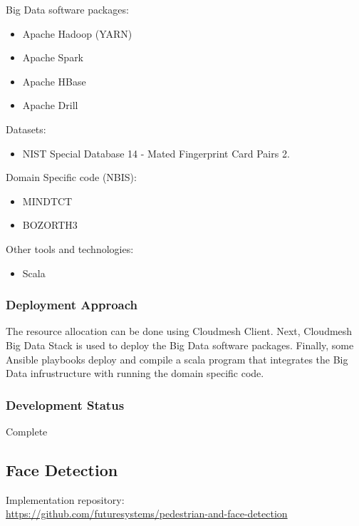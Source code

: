 \documentclass[9pt,twocolumn,twoside]{styles/osajnl}
\begin{document}
\begin{table}[htb]
Big Data software packages:

\begin{itemize}
\item Apache Hadoop (YARN)
\item Apache Spark
\item Apache HBase
\item Apache Drill
\end{itemize}

Datasets:
\begin{itemize}
\item NIST Special Database 14 - Mated Fingerprint Card Pairs 2.
\end{itemize}

Domain Specific code (NBIS):
\begin{itemize}
\item MINDTCT
\item BOZORTH3
\end{itemize}


Other tools and technologies:
\begin{itemize}
\item Scala
\end{itemize}

\subsubsection{Deployment Approach}

The resource allocation can be done using Cloudmesh Client.
Next, Cloudmesh Big Data Stack is used to deploy the Big Data software packages.
Finally, some Ansible playbooks deploy and compile a scala program that integrates the Big Data infrustructure with running the domain specific code.

\subsubsection{Development Status}

Complete


\subsection{Face Detection}

Implementation repository:\\
 \url{https://github.com/futuresystems/pedestrian-and-face-detection}


\end{table}
\end{document}
